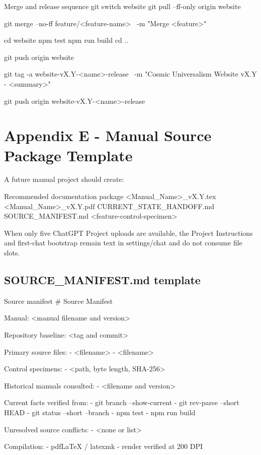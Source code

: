 \documentclass[11pt,letterpaper]{article}
\begin{document}
\begin{commandbox}{Merge and release sequence}
git switch website
git pull --ff-only origin website

git merge --no-ff feature/<feature-name> \
  -m "Merge <feature>"

cd website
npm test
npm run build
cd ..

git push origin website

git tag -a website-vX.Y-<name>-release \
  -m "Cosmic Universalism Website vX.Y - <summary>"

git push origin website-vX.Y-<name>-release
\end{commandbox}

\section{Appendix E - Manual Source Package Template}

A future manual project should create:

\begin{codebox}{Recommended documentation package}
<Manual_Name>_vX.Y.tex
<Manual_Name>_vX.Y.pdf
CURRENT_STATE_HANDOFF.md
SOURCE_MANIFEST.md
<feature-control-specimen>
\end{codebox}

When only five ChatGPT Project uploads are available, the Project Instructions
and first-chat bootstrap remain text in settings/chat and do not consume file
slots.

\subsection*{SOURCE\_MANIFEST.md template}

\begin{codebox}{Source manifest}
# Source Manifest

Manual:
<manual filename and version>

Repository baseline:
<tag and commit>

Primary source files:
- <filename>
- <filename>

Control specimens:
- <path, byte length, SHA-256>

Historical manuals consulted:
- <filename and version>

Current facts verified from:
- git branch --show-current
- git rev-parse --short HEAD
- git status --short --branch
- npm test
- npm run build

Unresolved source conflicts:
- <none or list>

Compilation:
- pdfLaTeX / latexmk
- render verified at 200 DPI
\end{codebox}
\end{document}
